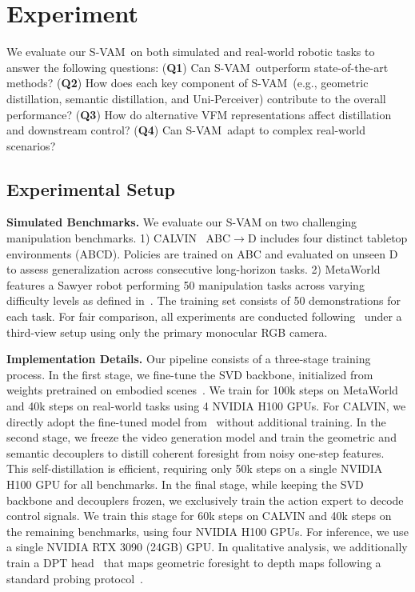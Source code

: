 \documentclass[runningheads]{llncs}
\newcommand{\Method}{S-VAM}
\begin{document}


\section{Experiment}

We evaluate our \Method~on both simulated and real-world robotic tasks to answer the following questions: (\textbf{Q1}) Can \Method~outperform state-of-the-art methods? (\textbf{Q2}) How does each key component of \Method~(e.g., geometric distillation, semantic distillation, and Uni-Perceiver) contribute to the overall performance? (\textbf{Q3}) How do alternative VFM representations affect distillation and downstream control? (\textbf{Q4}) Can \Method~adapt to complex real-world scenarios? 

\subsection{Experimental Setup}
\noindent \textbf{Simulated Benchmarks.} 
We evaluate our S-VAM on two challenging manipulation benchmarks. 1) CALVIN~\cite{mees2022calvin} ABC$\rightarrow$D includes four distinct tabletop environments (ABCD). Policies are trained on ABC and evaluated on unseen D to assess generalization across consecutive long-horizon tasks. 2) MetaWorld~\cite{yu2020meta} features a Sawyer robot performing 50 manipulation tasks across varying difficulty levels as defined in~\cite{seo2023masked}. The training set consists of 50 demonstrations for each task. For fair comparison, all experiments are conducted following~\cite{huvideo} under a third-view setup using only the primary monocular RGB camera.


\noindent \textbf{Implementation Details.}
Our pipeline consists of a three-stage training process.
In the first stage, we fine-tune the SVD backbone, initialized from weights pretrained on embodied scenes~\cite{huvideo}.
We train for 100k steps on MetaWorld and 40k steps on real-world tasks using 4 NVIDIA H100 GPUs.
For CALVIN, we directly adopt the fine-tuned model from~\cite{huvideo} without additional training.
In the second stage, we freeze the video generation model and train the geometric and semantic decouplers to distill coherent foresight from noisy one-step features. This self-distillation is efficient, requiring only 50k steps on a single NVIDIA H100 GPU for all benchmarks.
In the final stage, while keeping the SVD backbone and decouplers frozen, we exclusively train the action expert to decode control signals. We train this stage for 60k steps on CALVIN and 40k steps on the remaining benchmarks, using four NVIDIA H100 GPUs. For inference, we use a single NVIDIA RTX 3090 (24GB) GPU. In qualitative analysis, we additionally train a DPT head~\cite{Ranftl_2021_ICCV} that maps geometric foresight to depth maps following a standard probing protocol~\cite{li2025spatial,wu2026geometry}. 
\end{document}
